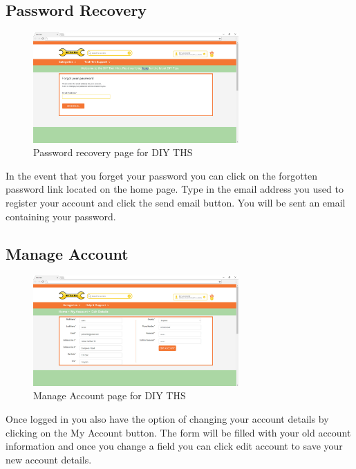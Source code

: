 \hypertarget{password-recovery}{%
\subsection{Password Recovery}\label{password-recovery}}

\begin{figure}[H]
      \centering
      \includegraphics[trim = 0 0 0 0, clip, width=0.7\textwidth]{TempImg/forgot_password.jpg}
      \caption{Password recovery page for DIY THS}
 \end{figure}

In the event that you forget your password you can click on the
forgotten password link located on the home page. Type in the email
address you used to register your account and click the send email
button. You will be sent an email containing your password.

\hypertarget{manage-account}{%
\subsection{Manage Account}\label{manage-account}}

\begin{figure}[H]
      \centering
      \includegraphics[trim = 0 0 0 0, clip, width=0.7\textwidth]{TempImg/manageAcc.png}
      \caption{Manage Account page for DIY THS}
 \end{figure}

Once logged in you also have the option of changing your account details
by clicking on the My Account button. The form will be filled with your
old account information and once you change a field you can click edit
account to save your new account details.

